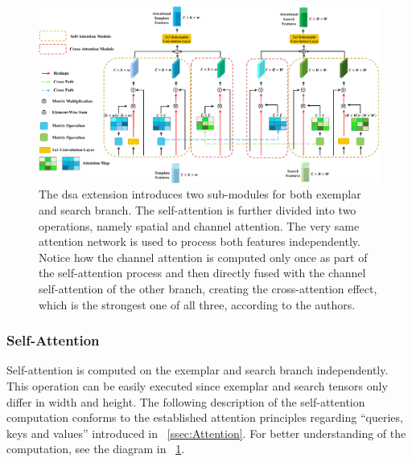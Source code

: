 \begin{figure}[t]
  \centerline{\includegraphics[width=\linewidth]{figures/siamese_tracking/deformable_siamese_attention.pdf}}
  \caption[\gls{dsa} diagram]{The \gls{dsa} extension introduces two sub-modules for both exemplar and search branch. The self-attention is further divided into two operations, namely spatial and channel attention. The very same attention network is used to process both features independently. Notice how the channel attention is computed only once as part of the self-attention process and then directly fused with the channel self-attention of the other branch, creating the cross-attention effect, which is the strongest one of all three, according to the authors. }
  \label{fig:DeformableSiameseAttention}
\end{figure}

\subsubsection{Self-Attention}

Self-attention is computed on the exemplar and search branch independently. This operation can be easily executed since exemplar and search tensors only differ in width and height. The following description of the self-attention computation conforms to the established attention principles regarding ``queries, keys and values'' introduced in \sectiontext{}~\ref{ssec:Attention}. For better understanding of the computation, see the diagram in \figtext{}~\ref{fig:DeformableSiameseAttention}.

